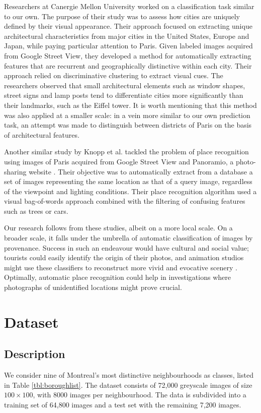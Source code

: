 \documentclass{acm_proc_article-sp}
\begin{document}
Researchers at Canergie Mellon University worked on a classification task similar to our own\cite{Doersch}. The purpose of their study was to assess how cities are uniquely defined by their visual appearance. Their approach focused on extracting unique architectural characteristics from major cities in the United States, Europe and Japan, while paying particular attention to Paris. Given labeled images acquired from Google Street View, they developed a method for automatically extracting features that are recurrent and geographically distinctive within each city. Their approach relied on discriminative clustering to extract visual cues. The researchers observed that small architectural elements such as window shapes, street signs and lamp posts tend to differentiate cities more significantly than their landmarks, such as the Eiffel tower. It is worth mentioning that this method was also applied at a smaller scale: in a vein more similar to our own prediction task, an attempt was made to distinguish between districts of Paris on the basis of architectural features.

Another similar study by Knopp et al. tackled the problem of place recognition using images of Paris acquired from Google Street View and Panoramio, a photo-sharing website \cite{Knopp}. Their objective was to automatically extract from a database a set of images representing the same location as that of a query image, regardless of the viewpoint and lighting conditions. Their place recognition algorithm used a visual bag-of-words approach combined with the filtering of confusing features such as trees or cars. 

Our research follows from these studies, albeit on a more local scale. On a broader scale, it falls under the umbrella of automatic classification of images by provenance. Success in such an endeavour would have cultural and social value; tourists could easily identify the origin of their photos, and animation studios might use these classifiers to reconstruct more vivid and evocative scenery \cite{Doersch}. Optimally, automatic place recognition could help in investigations where photographs of unidentified locations might prove crucial. 


\section{Dataset}

\subsection{Description}
We consider nine of Montreal's most distinctive neighbourhoods as classes, listed in Table \ref{tbl:boroughlist}. The dataset consists of 72,000 greyscale images of size $100\times100$, with 8000 images per neighbourhood. The data is subdivided into a training set of 64,800 images and a test set with the remaining 7,200 images. 
\end{document}
